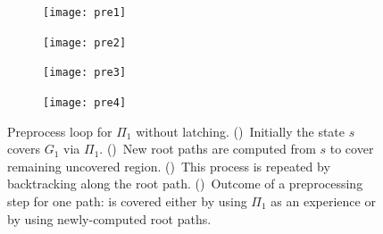 \documentclass[a4paper]{report}
\begin{document}
\begin{figure}[t]
    \centering
    \begin{subfigure}{.48\textwidth}
         \texttt{[image: pre1]}
        \caption{}
        \label{fig:pre1}
    \end{subfigure}
    \begin{subfigure}{.48\textwidth}
         \texttt{[image: pre2]}
        \caption{}
        \label{fig:pre2}
    \end{subfigure} 
    \begin{subfigure}{.48\textwidth}
         \texttt{[image: pre3]}
        \caption{}
        \label{fig:pre3}
    \end{subfigure}
    \begin{subfigure}{.48\textwidth}
         \texttt{[image: pre4]}
        \caption{}
        \label{fig:pre4}
    \end{subfigure}
    \caption{\CaptionTextSize
    Preprocess loop for $\Pi_1$ without latching.
    ()~Initially the state $s$ covers $G_1$ via $\Pi_1$. 
    ()~New root paths are computed from $s$ to cover remaining uncovered region.
    ()~This process is repeated by backtracking along the root path.
    ()~Outcome of a preprocessing step for one path: \Gfull is covered either by using $\Pi_1$ as an experience or by 
    using newly-computed root paths. 
    }
    \label{fig:pl_no_latching}
\end{figure}
\end{document}
